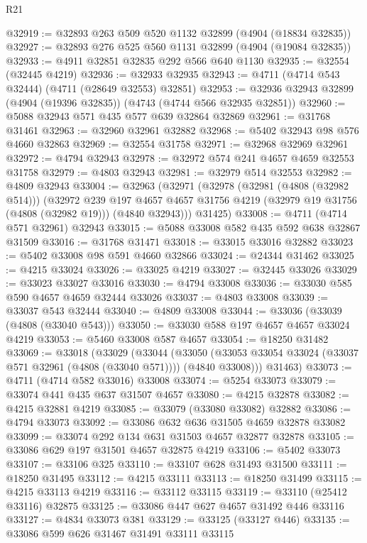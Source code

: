 \begin{lexlean}{R21}
\begin{coremodule}
@32919 := @32893 @263 @509 @520 @1132 @32899 (@4904 (@18834 @32835))
@32927 := @32893 @276 @525 @560 @1131 @32899 (@4904 (@19084 @32835))
@32933 := @4911 @32851 @32835 @292 @566 @640 @1130
@32935 := @32554 (@32445 @4219)
@32936 := @32933 @32935
@32943 := @4711 (@4714 @543 @32444) (@4711 (@28649 @32553) @32851)
@32953 := @32936 @32943 @32899 (@4904 (@19396 @32835)) (@4743 (@4744 @566 @32935 @32851))
@32960 := @5088 @32943 @571 @435 @577 @639 @32864 @32869
@32961 := @31768 @31461
@32963 := @32960 @32961 @32882
@32968 := @5402 @32943 @98 @576 @4660 @32863
@32969 := @32554 @31758
@32971 := @32968 @32969 @32961
@32972 := @4794 @32943
@32978 := @32972 @574 @241 @4657 @4659 @32553 @31758
@32979 := @4803 @32943
@32981 := @32979 @514 @32553
@32982 := @4809 @32943
@33004 := @32963
    (@32971
      (@32978
        (@32981 (@4808 (@32982 @514)))
        (@32972
          @239
          @197
          @4657
          @4657
          @31756
          @4219
          (@32979 @19 @31756 (@4808 (@32982 @19)))
          (@4840 @32943)))
      @31425)
@33008 := @4711 (@4714 @571 @32961) @32943
@33015 := @5088 @33008 @582 @435 @592 @638 @32867 @31509
@33016 := @31768 @31471
@33018 := @33015 @33016 @32882
@33023 := @5402 @33008 @98 @591 @4660 @32866
@33024 := @24344 @31462
@33025 := @4215 @33024
@33026 := @33025 @4219
@33027 := @32445 @33026
@33029 := @33023 @33027 @33016
@33030 := @4794 @33008
@33036 := @33030 @585 @590 @4657 @4659 @32444 @33026
@33037 := @4803 @33008
@33039 := @33037 @543 @32444
@33040 := @4809 @33008
@33044 := @33036 (@33039 (@4808 (@33040 @543)))
@33050 := @33030 @588 @197 @4657 @4657 @33024 @4219
@33053 := @5460 @33008 @587 @4657
@33054 := @18250 @31482
@33069 := @33018
    (@33029
      (@33044
        (@33050 (@33053 @33054 @33024 (@33037 @571 @32961 (@4808 (@33040 @571)))) (@4840 @33008)))
      @31463)
@33073 := @4711 (@4714 @582 @33016) @33008
@33074 := @5254 @33073
@33079 := @33074 @441 @435 @637 @31507 @4657
@33080 := @4215 @32878
@33082 := @4215 @32881 @4219
@33085 := @33079 (@33080 @33082) @32882
@33086 := @4794 @33073
@33092 := @33086 @632 @636 @31505 @4659 @32878 @33082
@33099 := @33074 @292 @134 @631 @31503 @4657 @32877 @32878
@33105 := @33086 @629 @197 @31501 @4657 @32875 @4219
@33106 := @5402 @33073
@33107 := @33106 @325
@33110 := @33107 @628 @31493 @31500
@33111 := @18250 @31495
@33112 := @4215 @33111
@33113 := @18250 @31499
@33115 := @4215 @33113 @4219
@33116 := @33112 @33115
@33119 := @33110 (@25412 @33116) @32875
@33125 := @33086 @447 @627 @4657 @31492 @446 @33116
@33127 := @4834 @33073 @381
@33129 := @33125 (@33127 @446)
@33135 := @33086 @599 @626 @31467 @31491 @33111 @33115

\end{coremodule}
\end{lexlean}
